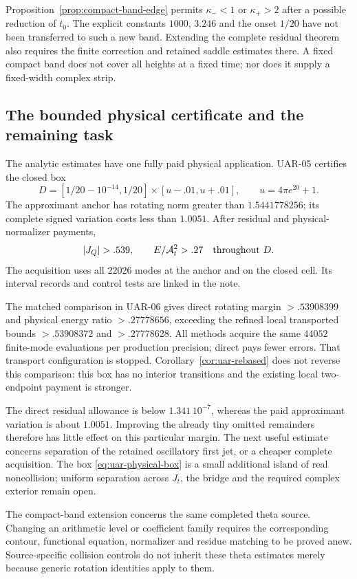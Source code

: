 Proposition~\ref{prop:compact-band-edge} permits $\kappa_-<1$ or
$\kappa_+>2$ after a possible reduction of $t_0$.
The explicit constants $1000$, $3.246$ and the onset $1/20$ have
not been transferred to such a new band. Extending the complete
residual theorem also requires the finite correction and retained
saddle estimates there. A fixed compact band does not cover all heights
at a fixed time; nor does it supply a fixed-width complex strip.

\subsection{The bounded physical certificate and the remaining task}

The analytic estimates have one fully paid physical application.
{UAR-05} certifies the closed box
\begin{equation}\label{eq:uar-physical-box}
 D=[1/20-10^{-14},1/20]\times[u-.01,u+.01],
 \qquad u=4\pi e^{20}+1.
\end{equation}
The approximant anchor has rotating norm greater than $1.5441778256$;
its complete signed variation costs less than $1.0051$.
After residual and physical-normalizer payments,
\[
 |J_Q|>.539,\qquad E/\mathcal A_t^2>.27
 \quad\hbox{throughout }D.
\]
The acquisition uses all $22026$ modes at the anchor and on the
closed cell. Its interval records and control tests are linked in the note.

The matched comparison in
{UAR-06} gives direct rotating margin $>.53908399$ and physical
energy ratio $>.27778656$, exceeding the refined local transported
bounds $>.53908372$ and $>.27778628$.
All methods acquire the same $44052$ finite-mode evaluations per
production precision; direct pays fewer errors. That transport
configuration is stopped. Corollary~\ref{cor:uar-rebased} does not
reverse this comparison: this box has no interior transitions and
the existing local two-endpoint payment is stronger.

The direct residual allowance is below $1.341\,10^{-7}$, whereas
the paid approximant variation is about $1.0051$. Improving the
already tiny omitted remainders therefore has little effect on this
particular margin. The next useful estimate concerns separation of
the retained oscillatory first jet, or a cheaper complete acquisition.
The box \eqref{eq:uar-physical-box} is a small additional island of
real noncollision; uniform separation across $J_t$, the bridge and the
required complex exterior remain open.

The compact-band extension concerns the same completed theta source.
Changing an arithmetic level or coefficient family requires the
corresponding contour, functional equation, normalizer and residue
matching to be proved anew. Source-specific collision controls do not
inherit these theta estimates merely because generic rotation
identities apply to them.
